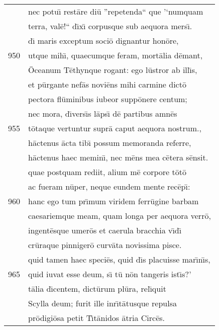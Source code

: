 \documentclass[paper=6in:9in,pagesize=pdftex,
               headinclude=on,footinclude=on,12pt]{scrbook}
\begin{document}
\begin{longtable}[p]{ r l }
 & nec potu\={\i} rest\=are di\=u ''repetenda`` que '`numquam\\ 
 & terra, val\=e!`` d\={\i}x\={\i} corpusque sub aequora mers\={\i}.\\ 
 & d\={\i} maris exceptum soci\=o dignantur hon\=ore,\\ 
950 & utque mih\={\i}, quaecumque feram, mort\=alia d\=emant,\\ 
 & \=Oceanum T\=ethynque rogant: ego l\=ustror ab ill\={\i}s,\\ 
 & et p\=urgante nef\=as novi\=ens mihi carmine dict\=o\\ 
 & pectora fl\=uminibus iubeor supp\=onere centum;\\ 
 & nec mora, d\={\i}vers\={\i}s l\=aps\={\i} d\=e partibus amn\=es\\ 
955 & t\=otaque vertuntur supr\=a caput aequora nostrum.,\\ 
 & h\=actenus \=acta tib\={\i} possum memoranda referre,\\ 
 & h\=actenus haec memin\={\i}, nec m\=ens mea c\=etera s\=ensit.\\ 
 & quae postquam rediit, alium m\=e corpore t\=ot\=o\\ 
 & ac fueram n\=uper, neque eundem mente rec\=ep\={\i}:\\ 
960 & hanc ego tum pr\={\i}mum viridem ferr\=ugine barbam\\ 
 & caesariemque meam, quam longa per aequora verr\=o,\\ 
 & ingent\=esque umer\=os et caerula bracchia v\={\i}d\={\i}\\ 
 & cr\=uraque pinniger\=o curv\=ata novissima pisce.\\ 
 & quid tamen haec speci\=es, quid d\={\i}s placuisse mar\={\i}n\={\i}s,\\ 
965 & quid iuvat esse deum, s\={\i} t\=u n\=on tangeris ist\={\i}s?'\\ 
 & t\=alia d\={\i}centem, dict\=urum pl\=ura, rel\={\i}quit\\ 
 & Scylla deum; furit ille inr\={\i}t\=atusque repulsa\\ 
 & pr\=odigi\=osa petit T\={\i}t\=anidos \=atria Circ\=es.\\ 

\end{longtable}
\end{document}
